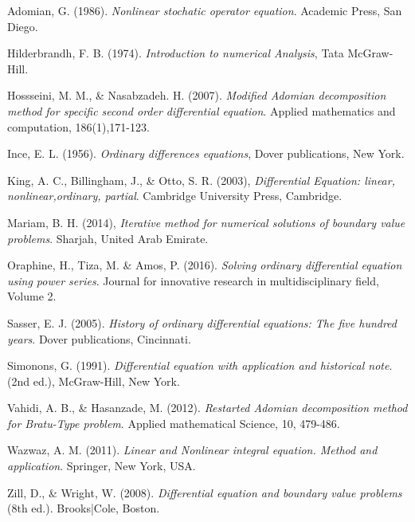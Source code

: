 \documentclass[11pt]{report}
\begin{document}
	\begin{description}
		\item Adomian, G. (1986). \emph{Nonlinear stochatic operator equation}. Academic Press, San Diego.
		
		\item Hilderbrandh, F. B. (1974). \emph{Introduction to numerical Analysis}, Tata McGraw-Hill.
		
		\item Hossseini, M. M., \& Nasabzadeh. H. (2007). \emph{Modified Adomian decomposition method for specific second order differential equation}. Applied mathematics and computation, 186(1),171-123.
		
		\item Ince, E. L. (1956). \emph{Ordinary differences equations}, Dover publications, New York.
		
		\item King, A. C., Billingham, J., \& Otto, S. R. (2003), \emph{Differential Equation: linear, nonlinear,ordinary, partial}. Cambridge University Press, Cambridge.
		
		\item Mariam, B. H. (2014), \emph{Iterative method for numerical solutions of boundary value problems}. Sharjah, United Arab Emirate.
		
		\item Oraphine, H., Tiza, M. \& Amos, P. (2016). \emph{Solving ordinary differential equation using power series}. Journal for innovative research in multidisciplinary field, Volume 2.
		
		\item Sasser, E. J. (2005). \emph{History of ordinary differential equations: The five hundred years}. Dover publications, Cincinnati.
		
		\item Simonons, G. (1991). \emph{Differential equation with application and historical note}. (2nd ed.), McGraw-Hill, New York. 
		
		\item Vahidi, A. B., \& Hasanzade, M. (2012). \emph{Restarted Adomian decomposition method for Bratu-Type problem}. Applied mathematical Science, 10, 479-486.
		
		\item Wazwaz, A. M. (2011). \emph{Linear and Nonlinear integral equation. Method and application}. Springer, New York, USA.
		
		\item Zill, D., \& Wright, W. (2008). \emph{Differential equation and boundary value problems} (8th ed.). Brooks|Cole, Boston.
	\end{description}
	
\end{document}
